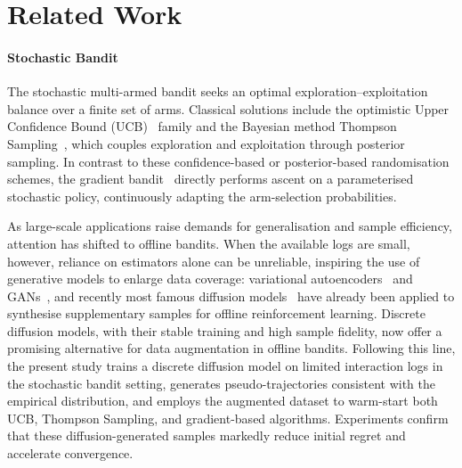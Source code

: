 \section{Related Work} \label{sec:2_related_work}

\paragraph{Stochastic Bandit}
The stochastic multi-armed bandit seeks an optimal exploration–exploitation balance over a finite set of arms. Classical solutions include the optimistic Upper Confidence Bound (UCB)~\cite{UCB} family and the Bayesian method Thompson Sampling~\cite{TS}, which couples exploration and exploitation through posterior sampling. In contrast to these confidence-based or posterior-based randomisation schemes, the gradient bandit~\cite{sutton1999policy} directly performs ascent on a parameterised stochastic policy, continuously adapting the arm-selection probabilities.

As large-scale applications raise demands for generalisation and sample efficiency, attention has shifted to offline bandits. When the available logs are small, however, reliance on estimators alone can be unreliable, inspiring the use of generative models to enlarge data coverage: variational autoencoders~\cite{VAE} and GANs~\cite{GAN}, and recently most famous diffusion models~\cite{ddpm} have already been applied to synthesise supplementary samples for offline reinforcement learning. Discrete diffusion models, with their stable training and high sample fidelity, now offer a promising alternative for data augmentation in offline bandits. Following this line, the present study trains a discrete diffusion model on limited interaction logs in the stochastic bandit setting, generates pseudo-trajectories consistent with the empirical distribution, and employs the augmented dataset to warm-start both UCB, Thompson Sampling, and gradient-based algorithms. Experiments confirm that these diffusion-generated samples markedly reduce initial regret and accelerate convergence.



